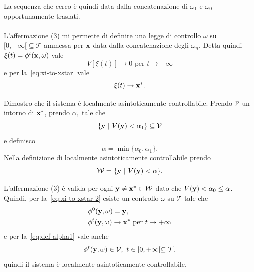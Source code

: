 \begin{steps}
    La sequenza che cerco è quindi data dalla concatenazione di
    $\omega_1$ e $\omega_0$ opportunamente traslati.

    \hfill\openbox\paragraph{}

    L'affermazione (3) mi permette di definire una legge di controllo
    $\omega$ su $[0, +\infty[ \subseteq \mathcal T$ ammessa per $\mathbf{x}$
    data dalla concatenazione degli $\omega_n$.
    Detta quindi $\xi(t) = \phi^t(\mathbf{x}, \omega)$ vale
    \begin{equation*}
        V[\xi(t)] \to 0 \text{ per } t \to +\infty
    \end{equation*}
    e per la~\eqref{eq:xi-to-xstar} vale
    \begin{equation}
        \xi(t) \to \mathbf{x}^*.
        \label{eq:xi-to-xstar-2}
    \end{equation}

    \item Dimostro che il sistema è localmente asintoticamente
    controllabile.
    Prendo $\mathcal V$ un intorno di $\mathbf{x}^*$, prendo $\alpha_1$ tale che
    \begin{equation}
     \{\mathbf{y}\ |\ V(\mathbf{y}) < \alpha_1 \} \subseteq \mathcal V
        \label{eq:def-alpha1}
    \end{equation}
    e definisco
    \begin{equation*}
        \alpha = \min\{\alpha_0, \alpha_1\}.
    \end{equation*}
    Nella definizione di localmente asintoticamente controllabile prendo
    \begin{equation*}
            \mathcal W = \{\mathbf{y}\ |\ V(\mathbf{y}) < \alpha\}.
    \end{equation*}

    L'affermazione (3) è valida per ogni $\mathbf{y} \neq \mathbf{x}^* \in \mathcal W$
    dato che $V(\mathbf{y}) < \alpha_0 \leq \alpha$.
    Quindi, per la~\eqref{eq:xi-to-xstar-2} esiste un controllo $\omega$
    su $\mathcal T$ tale che
    \begin{align*}
        &\phi^0(\mathbf{y}, \omega) = \mathbf{y}, \\
        &\phi^t(\mathbf{y}, \omega) \to \mathbf{x}^* \text{ per } t \to +\infty
    \end{align*}
    e per la~\eqref{eq:def-alpha1} vale anche
    \begin{equation*}
        \phi^t(\mathbf{y}, \omega) \in \mathcal V, \ t \in [0, +\infty[ \subseteq \mathcal T.
    \end{equation*}
    quindi il sistema è localmente asintoticamente controllabile.


\end{steps}
